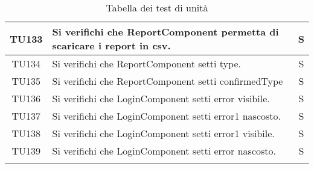 \begin{center}
\begin{longtable}{|c|p{10cm}|c|}
			\hline
			TU133 & Si verifichi che ReportComponent permetta di scaricare i report in csv.  & S \\
			\hline
			TU134 & Si verifichi che ReportComponent setti type.  & S \\
			\hline
			TU135 & Si verifichi che ReportComponent setti confirmedType  & S \\
			\hline
			TU136 & Si verifichi che LoginComponent setti error visibile.  & S \\
			\hline
			TU137 & Si verifichi che LoginComponent setti error1 nascosto. & S \\
			\hline
			TU138 & Si verifichi che LoginComponent setti error1 visibile.  & S \\
			\hline
			TU139 & Si verifichi che LoginComponent setti error nascosto. & S \\
			\hline
			
			\hiderowcolors
			\caption{Tabella dei test di unità}		
		\end{longtable}	
	\end{center}

